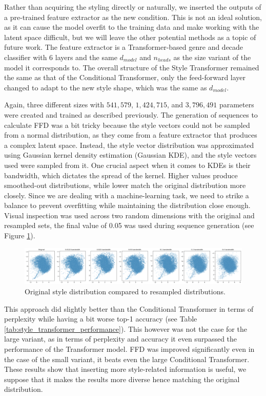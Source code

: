 \documentclass{article}
\begin{document}
Rather than acquiring the styling directly or naturally, we inserted the outputs of a pre-trained feature extractor as the new condition. This is not an ideal solution, as it can cause the model overfit to the training data and make working with the latent space difficult, but we will leave the other potential methods as a topic of future work. The feature extractor is a Transformer-based genre and decade classifier with 6 layers and the same $d_{model}$ and $n_{heads}$ as the size variant of the model it corresponds to. The overall structure of the Style Transformer remained the same as that of the Conditional Transformer, only the feed-forward layer changed to adapt to the new style shape, which was the same as $d_{model}$.

Again, three different sizes with $541,579$, $1,424,715$, and $3,796,491$ parameters were created and trained as described previously. The generation of sequences to calculate FFD was a bit tricky because the style vectors could not be sampled from a normal distribution, as they come from a feature extractor that produces a complex latent space. Instead, the style vector distribution was approximated using Gaussian kernel density estimation (Gaussian KDE), and the style vectors used were sampled from it. One crucial aspect when it comes to KDEs is their bandwidth, which dictates the spread of the kernel. Higher values produce smoothed-out distributions, while lower match the original distribution more closely. Since we are dealing with a machine-learning task, we need to strike a balance to prevent overfitting while maintaining the distribution close enough. Visual inspection was used across two random dimensions with the original and resampled sets, the final value of 0.05 was used during sequence generation (see Figure \ref{fig:gaussian_kde_bandwith_plot}).

\begin{figure}[!htbp]
    \centering
    \includegraphics[width=1\linewidth]{images/gaussian-kde-bandwidth.png}
    \caption{Original style distribution compared to resampled distributions.}
    \label{fig:gaussian_kde_bandwith_plot}
\end{figure}

This approach did slightly better than the Conditional Transformer in terms of perplexity while having a bit worse top-1 accuracy (see Table \ref{tab:style_transformer_performance}). This however was not the case for the large variant, as in terms of perplexity and accuracy it even surpassed the performance of the Transformer model. FFD was improved significantly even in the case of the small variant, it beats even the large Conditional Transformer. These results show that inserting more style-related information is useful, we suppose that it makes the results more diverse hence matching the original distribution.
\end{document}
